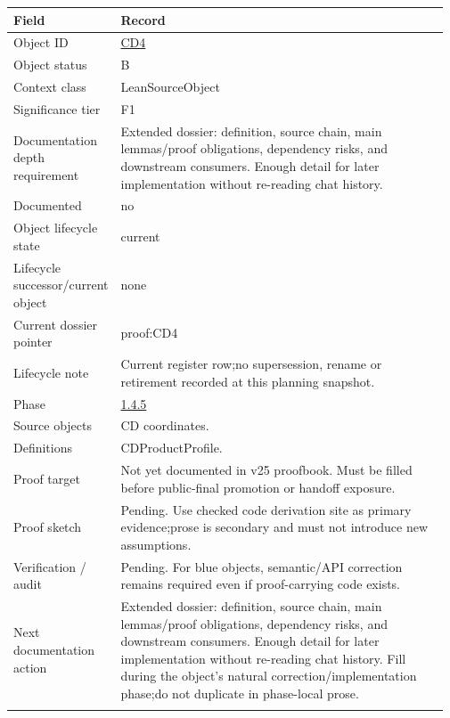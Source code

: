 \begin{longtable}{L{0.16\linewidth} L{0.81\linewidth}}
\hline
\textbf{Field} & \textbf{Record}\\
\hline
Object ID & \hyperlink{object-row-CD4}{CD4}\\
\hline\addlinespace[0.20em]
Object status & B\\
\hline\addlinespace[0.20em]
Context class & LeanSourceObject\\
\hline\addlinespace[0.20em]
Significance tier & F1\\
\hline\addlinespace[0.20em]
Documentation depth requirement & Extended dossier: definition, source chain, main lemmas/\allowbreak{}proof obligations, dependency risks, and downstream consumers. Enough detail for later implementation without re-reading chat history.\\
\hline\addlinespace[0.20em]
Documented & no\\
\hline\addlinespace[0.20em]
Object lifecycle state & current\\
\hline\addlinespace[0.20em]
Lifecycle successor/\allowbreak{}current object & none\\
\hline\addlinespace[0.20em]
Current dossier pointer & proof:CD4\\
\hline\addlinespace[0.20em]
Lifecycle note & Current register row;\newline no supersession, rename or retirement recorded at this planning snapshot.\\
\hline\addlinespace[0.20em]
Phase & \hyperlink{phase-row-1-4-5}{1.4.5}\\
\hline\addlinespace[0.20em]
Source objects & CD coordinates.\\
\hline\addlinespace[0.20em]
Definitions & CDProductProfile.\\
\hline\addlinespace[0.20em]
Proof target & Not yet documented in v25 proofbook. Must be filled before public-final promotion or handoff exposure.\\
\hline\addlinespace[0.20em]
Proof sketch & Pending. Use checked code derivation site as primary evidence;\newline prose is secondary and must not introduce new assumptions.\\
\hline\addlinespace[0.20em]
Verification /\allowbreak{} audit & Pending. For blue objects, semantic/\allowbreak{}API correction remains required even if proof-carrying code exists.\\
\hline\addlinespace[0.20em]
Next documentation action & Extended dossier: definition, source chain, main lemmas/\allowbreak{}proof obligations, dependency risks, and downstream consumers. Enough detail for later implementation without re-reading chat history. Fill during the object's natural correction/\allowbreak{}implementation phase;\newline do not duplicate in phase-local prose.\\
\hline\addlinespace[0.20em]
\end{longtable}
